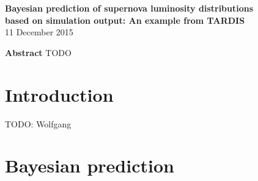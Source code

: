 \documentclass[11pt]{article}
\begin{document}
\begin{center}
  \textbf{\Large Bayesian prediction of supernova luminosity  distributions}\\[8pt]
  \textbf{\Large based on simulation output: An example from TARDIS}\\[12pt]
  11 December 2015
\end{center}

\textbf{Abstract} TODO

\section{Introduction}

TODO: Wolfgang

\section{Bayesian prediction}
\end{document}
